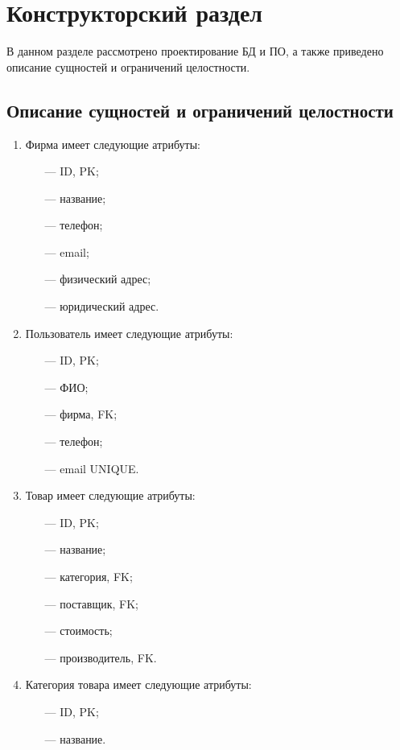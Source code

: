 \chapter{Конструкторский раздел}
В данном разделе рассмотрено проектирование БД и ПО, а также приведено описание сущностей и ограничений целостности.

\section{Описание сущностей и ограничений целостности}
\begin{enumerate}
	\item Фирма имеет следующие атрибуты: 
	\begin{itemize}
		\item[---] ID, PK;
		\item[---] название;
		\item[---] телефон;
		\item[---] email;
		\item[---] физический адрес;
		\item[---] юридический адрес.
	\end{itemize}
	
	\item Пользователь имеет следующие атрибуты: 
	\begin{itemize}
		\item[---] ID, PK;
		\item[---] ФИО;
		\item[---] фирма, FK;
		\item[---] телефон;
		\item[---] email UNIQUE.
	\end{itemize}

	\item Товар имеет следующие атрибуты: 
	\begin{itemize}
		\item[---] ID, PK;
		\item[---] название;
		\item[---] категория, FK;
		\item[---] поставщик, FK;
		\item[---] стоимость;
		\item[---] производитель, FK.
	\end{itemize}
\newpage
	\item Категория товара имеет следующие атрибуты: 
	\begin{itemize}
		\item[---] ID, PK;
		\item[---] название.
	\end{itemize}
	

\end{enumerate}
